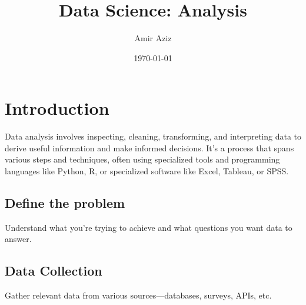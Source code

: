 \documentclass{article}
\title{Data Science: Analysis}
\author{Amir Aziz}
\date{\today}
\begin{document}
\maketitle
\section{Introduction}
Data analysis involves inspecting, cleaning, transforming, and interpreting data to derive useful information and make informed decisions. It's a process that spans various steps and techniques, often using specialized tools and programming languages like Python, R, or specialized software like Excel, Tableau, or SPSS.
\subsection{Define the problem}
 Understand what you're trying to achieve and what questions you want data to answer.
\subsection{Data Collection}
Gather relevant data from various sources—databases, surveys, APIs, etc.
\end{document}
